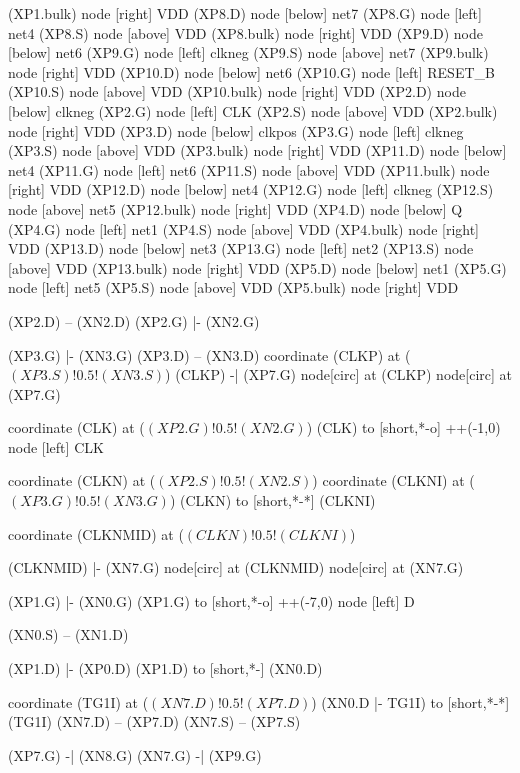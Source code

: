\begin{circuitikz}[american]
	(XP1.bulk) node [right]	{VDD}
	(XP8.D) node [below]	{net7}
	(XP8.G) node [left]	{net4}
	(XP8.S) node [above]	{VDD}
	(XP8.bulk) node [right]	{VDD}
	(XP9.D) node [below]	{net6}
	(XP9.G) node [left]	{clkneg}
	(XP9.S) node [above]	{net7}
	(XP9.bulk) node [right]	{VDD}
	(XP10.D) node [below]	{net6}
	(XP10.G) node [left]	{RESET\_B}
	(XP10.S) node [above]	{VDD}
	(XP10.bulk) node [right]	{VDD}
	(XP2.D) node [below]	{clkneg}
	(XP2.G) node [left]	{CLK}
	(XP2.S) node [above]	{VDD}
	(XP2.bulk) node [right]	{VDD}
	(XP3.D) node [below]	{clkpos}
	(XP3.G) node [left]	{clkneg}
	(XP3.S) node [above]	{VDD}
	(XP3.bulk) node [right]	{VDD}
	(XP11.D) node [below]	{net4}
	(XP11.G) node [left]	{net6}
	(XP11.S) node [above]	{VDD}
	(XP11.bulk) node [right]	{VDD}
	(XP12.D) node [below]	{net4}
	(XP12.G) node [left]	{clkneg}
	(XP12.S) node [above]	{net5}
	(XP12.bulk) node [right]	{VDD}
	(XP4.D) node [below]	{Q}
	(XP4.G) node [left]	{net1}
	(XP4.S) node [above]	{VDD}
	(XP4.bulk) node [right]	{VDD}
	(XP13.D) node [below]	{net3}
	(XP13.G) node [left]	{net2}
	(XP13.S) node [above]	{VDD}
	(XP13.bulk) node [right]	{VDD}
	(XP5.D) node [below]	{net1}
	(XP5.G) node [left]	{net5}
	(XP5.S) node [above]	{VDD}
	(XP5.bulk) node [right]	{VDD}
\fi


	(XP2.D) -- (XN2.D)
	(XP2.G) |- (XN2.G)
	
	(XP3.G) |- (XN3.G)
	(XP3.D) -- (XN3.D)
	coordinate (CLKP) at ($(XP3.S)!0.5!(XN3.S)$)
	(CLKP) -| (XP7.G)
	node[circ] at (CLKP) {}
	node[circ] at (XP7.G) {}
	
	coordinate (CLK) at ($(XP2.G)!0.5!(XN2.G)$)
	(CLK) to [short,*-o] ++(-1,0) node [left] {CLK}
	
	coordinate (CLKN) at ($(XP2.S)!0.5!(XN2.S)$)
	coordinate (CLKNI) at ($(XP3.G)!0.5!(XN3.G)$)
	(CLKN) to [short,*-*] (CLKNI)
	
	coordinate (CLKNMID) at ($(CLKN)!0.5!(CLKNI)$)
	
	(CLKNMID) |- (XN7.G)
	node[circ] at (CLKNMID){}
	node[circ] at (XN7.G){}
	
	(XP1.G) |- (XN0.G)
	(XP1.G) to [short,*-o] ++(-7,0) node [left] {D}
	
	(XN0.S) -- (XN1.D) 
	
	(XP1.D) |- (XP0.D)
	(XP1.D) to [short,*-] (XN0.D)
	
	coordinate (TG1I) at ($(XN7.D)!0.5!(XP7.D)$)
	(XN0.D |- TG1I) to [short,*-*] (TG1I)
	(XN7.D) -- (XP7.D)
	(XN7.S) -- (XP7.S)
	
	(XP7.G) -| (XN8.G)
	(XN7.G)  -| (XP9.G)
	

\end{circuitikz}
